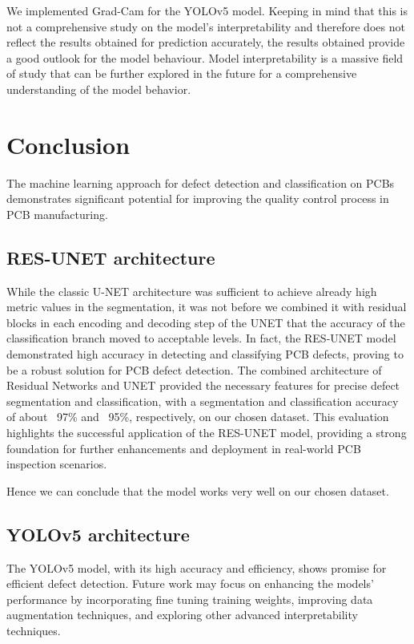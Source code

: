 \documentclass[12pt]{article}
\begin{document}
We implemented Grad-Cam for the YOLOv5 model. Keeping in mind that this is not a comprehensive study on the model's interpretability and therefore does not reflect the results obtained for prediction accurately, the results obtained provide a good outlook for the model behaviour. 
Model interpretability is a massive field of study that can be further explored in the future for a comprehensive understanding of the model behavior.

\clearpage
\newpage

\section{Conclusion}

The machine learning approach for defect detection and classification on PCBs demonstrates significant potential for improving the quality control process in PCB manufacturing. 

\subsection{RES-UNET architecture}
While the classic U-NET architecture was sufficient to achieve already high metric values in the segmentation, it was not before we combined it with residual blocks in each encoding and decoding step of the UNET that the accuracy of the classification branch moved to acceptable levels. In fact, the RES-UNET model demonstrated high accuracy in detecting and classifying PCB defects, proving to be a robust solution for PCB defect detection. The combined architecture of Residual Networks and UNET provided the necessary features for precise defect segmentation and classification,  with a segmentation and classification accuracy of about ~97\% and ~95\%, respectively, on our chosen dataset. This evaluation highlights the successful application of the RES-UNET model, providing a strong foundation for further enhancements and deployment in real-world PCB inspection scenarios.

Hence we can conclude that the model works very well on our chosen dataset.

\subsection{YOLOv5 architecture}
The YOLOv5 model, with its high accuracy and efficiency, shows promise for efficient defect detection. Future work may focus on enhancing the models' performance by incorporating fine tuning training weights, improving data augmentation techniques, and exploring other advanced interpretability techniques.
\end{document}
